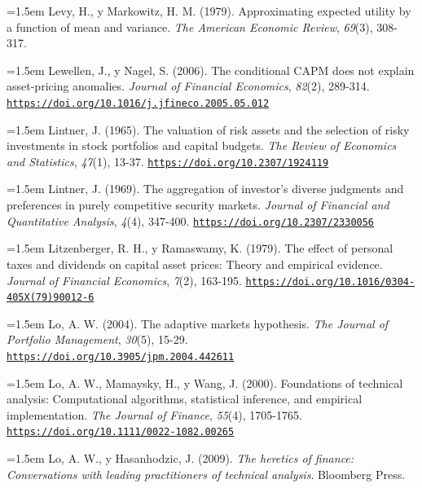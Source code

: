 \documentclass[10pt,a4paper]{article}
\begin{document}
\noindent\hangindent=1.5em Levy, H., y Markowitz, H. M. (1979). Approximating expected utility by a function of mean and variance. \textit{The American Economic Review}, \textit{69}(3), 308-317.

\noindent\hangindent=1.5em Lewellen, J., y Nagel, S. (2006). The conditional CAPM does not explain asset-pricing anomalies. \textit{Journal of Financial Economics}, \textit{82}(2), 289-314. \href{https://doi.org/10.1016/j.jfineco.2005.05.012}{\nolinkurl{https://doi.org/10.1016/j.jfineco.2005.05.012}}

\noindent\hangindent=1.5em Lintner, J. (1965). The valuation of risk assets and the selection of risky investments in stock portfolios and capital budgets. \textit{The Review of Economics and Statistics}, \textit{47}(1), 13-37. \href{https://doi.org/10.2307/1924119}{\nolinkurl{https://doi.org/10.2307/1924119}}

\noindent\hangindent=1.5em Lintner, J. (1969). The aggregation of investor's diverse judgments and preferences in purely competitive security markets. \textit{Journal of Financial and Quantitative Analysis}, \textit{4}(4), 347-400. \href{https://doi.org/10.2307/2330056}{\nolinkurl{https://doi.org/10.2307/2330056}}

\noindent\hangindent=1.5em Litzenberger, R. H., y Ramaswamy, K. (1979). The effect of personal taxes and dividends on capital asset prices: Theory and empirical evidence. \textit{Journal of Financial Economics}, \textit{7}(2), 163-195. \href{https://doi.org/10.1016/0304-405X(79)90012-6}{\nolinkurl{https://doi.org/10.1016/0304-405X(79)90012-6}}

\noindent\hangindent=1.5em Lo, A. W. (2004). The adaptive markets hypothesis. \textit{The Journal of Portfolio Management}, \textit{30}(5), 15-29. \href{https://doi.org/10.3905/jpm.2004.442611}{\nolinkurl{https://doi.org/10.3905/jpm.2004.442611}}

\noindent\hangindent=1.5em Lo, A. W., Mamaysky, H., y Wang, J. (2000). Foundations of technical analysis: Computational algorithms, statistical inference, and empirical implementation. \textit{The Journal of Finance}, \textit{55}(4), 1705-1765. \href{https://doi.org/10.1111/0022-1082.00265}{\nolinkurl{https://doi.org/10.1111/0022-1082.00265}}

\noindent\hangindent=1.5em Lo, A. W., y Hasanhodzic, J. (2009). \textit{The heretics of finance: Conversations with leading practitioners of technical analysis}. Bloomberg Press.
\end{document}
